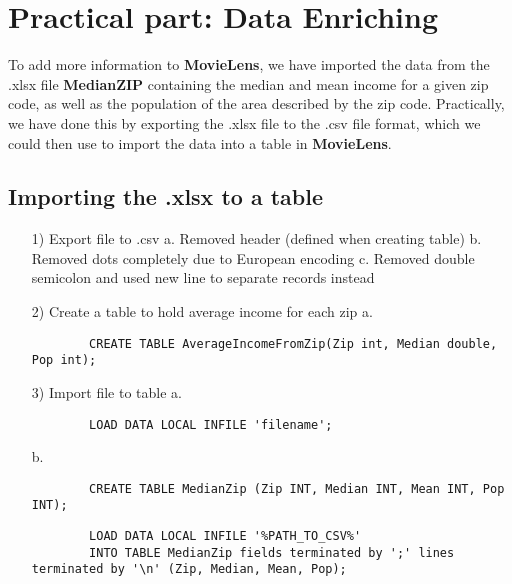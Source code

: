 \section{Practical part: Data Enriching}
To add more information to \textbf{MovieLens}, we have imported the data from the .xlsx file \textbf{MedianZIP} containing the median and mean income for a given zip code, as well as the population of the area described by the zip code. Practically, we have done this by exporting the .xlsx file to the .csv file format, which we could then use to import the data into a table in \textbf{MovieLens}.

\subsection{Importing the .xlsx to a table}
\begin{itemize}
	\item [1)]Export file to .csv
	\subitem a. Removed header (defined when creating table)
	\subitem b. Removed dots completely due to European encoding
	\subitem c. Removed double semicolon and used new line to separate records instead
	\item[2)]Create a table to hold average income for each zip
	\subitem a. 
	\begin{verbatim}
		CREATE TABLE AverageIncomeFromZip(Zip int, Median double, Pop int);
	\end{verbatim}
	\item [3)]Import file to table
	\subitem a. \begin{verbatim}
		LOAD DATA LOCAL INFILE 'filename';
	\end{verbatim}
	\subitem b. \begin{verbatim}
		CREATE TABLE MedianZip (Zip INT, Median INT, Mean INT, Pop INT);
		\end{verbatim}
		\begin{verbatim}
		LOAD DATA LOCAL INFILE '%PATH_TO_CSV%' 
		INTO TABLE MedianZip fields terminated by ';' lines terminated by '\n' (Zip, Median, Mean, Pop);
		\end{verbatim}
\end{itemize}



